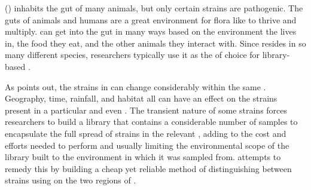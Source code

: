 \ecolilong{} (\ecoli{}) inhabits the gut of many animals, but only certain strains are pathogenic.
The guts of animals and humans are a great environment for flora like \ecoli{} to thrive and multiply.
\ecoli{} can get into the gut in many ways based on the environment the \host{} lives in, the food they eat, and the other animals they interact with.
Since \ecoli{} resides in so many different species, researchers typically use it as the \fib{} of choice for library-based \mst{}.

As \cite{rogers2005detecting} points out, the strains in \ecoli{} can change considerably  within the same \spec{}.
Geography, time, rainfall, and habitat all can have an effect on the strains present in a particular \spec{} and even \host{}.
The transient nature of some \ecoli{} strains forces researchers to build a library that contains a considerable number of samples to encapsulate the full spread of strains in the relevant \spec{}, adding to the cost and efforts needed to perform \mst{} and usually limiting the environmental scope of the library built to the environment in which it was sampled from.
\cploplong{} attempts to remedy this by building a cheap yet reliable method of distinguishing between strains using \pyros{} on the two \itsshort{} regions of \ecoli{}.